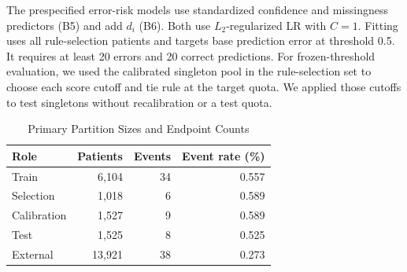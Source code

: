 \documentclass[conference]{IEEEtran}
\begin{document}
The prespecified error-risk models use standardized confidence and missingness predictors (B5) and add $d_i$ (B6). Both use $L_2$-regularized LR with $C = 1$. Fitting uses all rule-selection patients and targets base prediction error at threshold 0.5. It requires at least 20 errors and 20 correct predictions. For frozen-threshold evaluation, we used the calibrated singleton pool in the rule-selection set to choose each score cutoff and tie rule at the target quota. We applied those cutoffs to test singletons without recalibration or a test quota.

\begin{table}[t]
\caption{Primary Partition Sizes and Endpoint Counts}
\label{tab:partitions}
\centering
\footnotesize
\begin{tabular}{lrrr}
\toprule
Role & Patients & Events & Event rate (\%)\\
\midrule
Train & 6,104 & 34 & 0.557\\
Selection & 1,018 & 6 & 0.589\\
Calibration & 1,527 & 9 & 0.589\\
Test & 1,525 & 8 & 0.525\\
External & 13,921 & 38 & 0.273\\
\bottomrule
\end{tabular}
\end{table}
\end{document}
